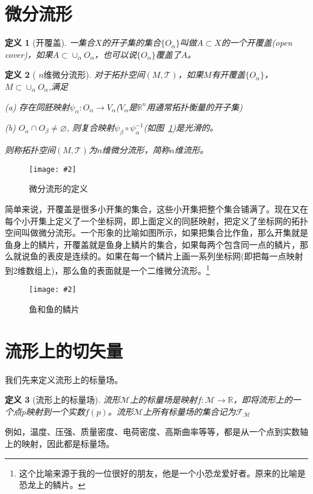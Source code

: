 \documentclass[11pt,a4paper]{ctexbook}
\newcommand{\cpic}[2]{
\begin{center}
\texttt{[image: \#2]}
\end{center}
}
\newcommand{\cpicn}[3]
{
\begin{figure}[H]
\cpic{#1}{#2}
\caption{\color{red}#3\label{#2}}
\end{figure}
}
\newtheorem{definition}{\hspace{2em} 定义}[section]
\begin{document}
\section{微分流形}
\begin{definition}[开覆盖]
  一集合$X$的开子集的集合$\{O_\alpha\}$叫做$A\subset X$的一个开覆盖(open cover)，如果$A\subset \cup_\alpha O_\alpha$，也可以说$\{O_\alpha\}$覆盖了$A$。
\end{definition}
\begin{definition}[ $n$维微分流形]
  
  对于拓扑空间$(M,\mathcal{T})$，如果$M$有开覆盖$\{O_\alpha\}$，$M\subset \cup_\alpha O_\alpha$,满足
  
  (a) 存在同胚映射$\psi_\alpha: O_\alpha \rightarrow V_\alpha$($V_\alpha$是$\mathbb{R}^n$用通常拓扑衡量的开子集)
  
  (b) $O_\alpha \cap O_\beta \ne \varnothing$, 则复合映射$\psi_\beta \circ \psi_\alpha^{-1}$(如图~\ref{manifold})是光滑的。
  
  则称拓扑空间$(M,\mathcal{T})$为$n$维微分流形，简称$n$维流形。
  
\end{definition}
\cpicn{0.5}{manifold}{微分流形的定义}

简单来说，开覆盖是很多小开集的集合，这些小开集把整个集合铺满了。现在又在每个小开集上定义了一个坐标网，即上面定义的同胚映射，把定义了坐标网的拓扑空间叫做微分流形。一个形象的比喻如图所示，如果把集合比作鱼，那么开集就是鱼身上的鳞片，开覆盖就是鱼身上鳞片的集合，如果每两个包含同一点的鳞片，那么就说鱼的表皮是连续的。如果在每一个鳞片上画一系列坐标网(即把每一点映射到2维数组上)，那么鱼的表面就是一个二维微分流形。\footnote{这个比喻来源于我的一位很好的朋友，他是一个小恐龙爱好者。原来的比喻是恐龙上的鳞片。}
\cpicn{0.4}{fish}{鱼和鱼的鳞片}
\section{流形上的切矢量}
我们先来定义流形上的标量场。
\begin{definition}[流形上的标量场]
  流形$\mathcal{M}$上的标量场是映射$f:\mathcal{M}\rightarrow \mathbb{R}$，即将流形上的一个点$p$映射到一个实数$f(p)$。流形$\mathcal{M}$上所有标量场的集合记为$\mathcal{F}_{\mathcal{M}}$
\end{definition}
例如，温度、压强、质量密度、电荷密度、高斯曲率等等，都是从一个点到实数轴上的映射，因此都是标量场。
\end{document}
